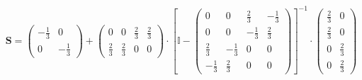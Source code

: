 \documentclass[10pt]{article} \usepackage{amsmath} \usepackage{bbold}
\begin{document}
\[ \mathbf{S} = \left(\begin{array}{cc} -\frac{1}{3} & 0 \\ 0 &
-\frac{1}{3} \end{array}\right) + \left(\begin{array}{cccc} 0 & 0 &
\frac{2}{3} & \frac{2}{3} \\ \frac{2}{3} & \frac{2}{3} & 0 & 0
\end{array}\right) \cdot \left[ \mathbb{I}  -
\left(\begin{array}{cccc} 0 & 0 & \frac{2}{3} & -\frac{1}{3} \\ 0 & 0
& -\frac{1}{3} & \frac{2}{3} \\ \frac{2}{3} & -\frac{1}{3} & 0 & 0 \\
-\frac{1}{3} & \frac{2}{3} & 0 & 0 \end{array}\right) \right]^{-1}
\cdot\left(\begin{array}{cc} \frac{2}{3} & 0 \\ \frac{2}{3} & 0 \\ 0 &
\frac{2}{3} \\ 0 & \frac{2}{3} \end{array}\right) \]
\end{document}
